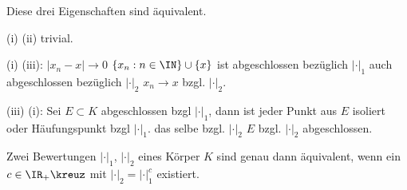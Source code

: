 \begin{Fakt}
 Diese drei Eigenschaften sind äquivalent.
\end{Fakt}

\begin{Beweis}
 (i) \gdw (ii) trivial.
 
 (i) \folge (iii): $|x_n-x|\rightarrow 0$ \folge $\{x_n: n\in\IN\}\cup \{x\}$ ist abgeschlossen bezüglich $|\cdot|_1$ \folge auch abgeschlossen bezüglich $|\cdot|_2$ \folge $x_n\rightarrow x$ bzgl. $|\cdot|_2$.
 
 (iii) \folge (i): Sei $E\subset K$ abgeschlossen bzgl $|\cdot|_1$, dann ist jeder Punkt aus $E$ isoliert oder Häufungspunkt bzgl $|\cdot|_1$. \folge das selbe bzgl. $|\cdot|_2$ \folge $E$ bzgl. $|\cdot|_2$ abgeschlossen.
\end{Beweis}

\begin{Fakt}
 Zwei Bewertungen $|\cdot|_1$, $|\cdot|_2$ eines Körper $K$ sind genau dann äquivalent, wenn ein $c\in\IR_+\kreuz$ mit $|\cdot|_2=|\cdot|_1^c$ existiert.
\end{Fakt}

